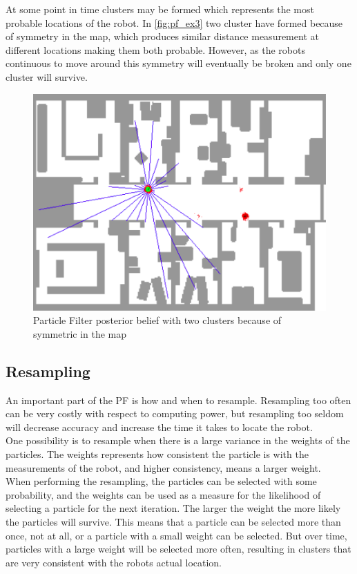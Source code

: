 At some point in time clusters may be formed which represents the most probable locations of the robot. In \autoref{fig:pf_ex3} two cluster have formed because of symmetry in the map, which produces similar distance measurement at different locations making them both probable. However, as the robots continuous to move around this symmetry will eventually be broken and only one cluster will survive.

\begin{figure}[H]
\centering
\includegraphics[scale=0.35]{images/particlefilter3}
\caption{Particle Filter posterior belief with two clusters because of symmetric in the map}
\label{fig:pf_ex3}
\end{figure}

\subsection{Resampling}

An important part of the PF is how and when to resample. Resampling too often can be very costly with respect to computing power, but resampling too seldom will decrease accuracy and increase the time it takes to locate the robot.\\

One possibility is to resample when there is a large variance in the weights of the particles. The weights represents how consistent the particle is with the measurements of the robot, and higher consistency, means a larger weight.\\

When performing the resampling, the particles can be selected with some probability, and the weights can be used as a measure for the likelihood of selecting a particle for the next iteration. The larger the weight the more likely the particles will survive. This means that a particle can be selected more than once, not at all, or a particle with a small weight can be selected. But over time, particles with a large weight will be selected more often, resulting in clusters that are very consistent with the robots actual location.